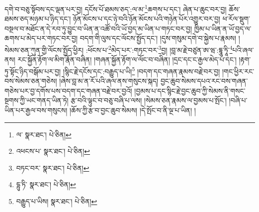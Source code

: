 དགེ་བ་བཅུ་སྟོབས་དང་ལྡན་པར་བྱ། དངོས་པོ་ཐམས་ཅད་:ལ་མ་\footnote{ལ་  སྣར་ཐང་།  པེ་ཅིན། }ཆགས་པ་དང་། ཞེན་པ་ཆུང་བར་བྱ། ཆོས་ཐམས་ཅད་མཉམ་པ་ཉིད་དང་། ཉོན་མོངས་པ་དང་ཉེ་བའི་ཉོན་མོངས་པའི་གཉེན་པོར་འགྱུར་བར་བྱ། ཕ་རོལ་སྡུག་བསྔལ་བ་མཐོང་ན་དེ་རབ་ཏུ་བྱུང་བ་ཡིན་ན་འཚོ་བའི་ཡོ་བྱད་མ་ཡིན་པ་གཏང་བར་བྱ། ཁྱིམ་པ་ཡིན་ན་ཡོ་བྱད་ལ་ཆགས་པ་མེད་པར་གཏང་བར་བྱ། བདག་གི་ལུས་དང་ལོངས་སྤྱོད་དང་། །དུས་གསུམ་དགེ་བ་སྐྱེས་པ་རྣམས། །སེམས་ཅན་ཀུན་གྱི་ལོངས་སྤྱོད་ཕྱིར། :ཕོངས་པ་\footnote{འཕངས་པ་  སྣར་ཐང་།  པེ་ཅིན། }མེད་པར་:གཏང་བར་\footnote{བཏང་བར་  སྣར་ཐང་།  པེ་ཅིན། }བྱ། །བླ་མ་རྗེ་བཙུན་ཨ་ཝ་:དྷཱུ་ཏཱི་\footnote{དྷུ་ཏི་  སྣར་ཐང་།  པེ་ཅིན། }པའི་ཞལ་ནས། རང་སྐྱོན་རྟོག་ལ་མིག་རྣོན་བཞིན། །གཞན་སྐྱོན་རྟོག་ལ་ལོང་བ་བཞིན། །དྲང་དང་ང་རྒྱལ་མེད་པ་དང་། །རྟག་ཏུ་སྟོང་ཉིད་བསྒོམ་པར་བྱ། །སྙིང་རྗེ་དངོས་དང་:བརྒྱུད་པ་ཡི།\footnote{བརྒྱུད་པ་ཡིས།  སྣར་ཐང་།  པེ་ཅིན། } །བདག་དང་གཞན་རྣམས་བརྗེ་བར་བྱ། །གང་ཕྱིར་རང་བས་སེམས་ཅན་གཅེས། །ཞེས་བླ་མ་ན་རོ་པའི་ཞལ་ནས་གསུངས་སྐད། བྱང་ཆུབ་སེམས་དཔའ་རང་བས་གཞན་གཅེས་པར་བྱ་དགོས་པས་བདག་དང་གཞན་བརྗེ་བར་བྱའོ། །བྱམས་པ་དང་སྙིང་རྗེ་བྱང་ཆུབ་ཀྱི་སེམས་ནི་གསང་སྔགས་ཀྱི་ཡང་གནད་ཡིན་ཏེ། རྩ་བའི་ལྟུང་བ་བཅུ་བཞི་པ་ལས། །སེམས་ཅན་རྣམས་ལ་བྱམས་པ་སྤོང་། །བཞི་པ་ཡིན་པར་རྒྱལ་བས་གསུངས། །ཆོས་ཀྱི་རྩ་བ་བྱང་ཆུབ་སེམས། །དེ་སྤོང་བ་ནི་ལྔ་པ་ཡིན། །
